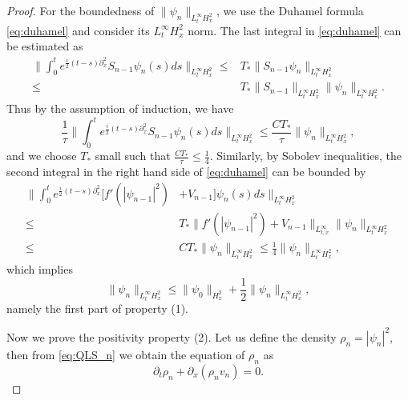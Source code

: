 \documentclass[leqno]{amsart}
\theoremstyle{plain}
\theoremstyle{definition}
\theoremstyle{remark}
\theoremstyle{plain}
\theoremstyle{plain}
\def\d{{\partial}}
\numberwithin{equation}{section}
\begin{document}
\begin{proof}
For the boundedness of $\|\psi_n\|_{L^\infty_tH^2_x}$, we use the Duhamel formula \eqref{eq:duhamel} and consider its $L^\infty_tH^2_x$ norm. The last integral in \eqref{eq:duhamel} can be estimated as
\begin{align*}
\|\int_0^te^{\frac{i}{2}(t-s)\d_x^2}S_{n-1}\psi_n(s)ds\|_{L^\infty_tH^2_x}\leq&  T_* \|S_{n-1}\psi_n \|_{L^\infty_tH^2_x}\\
\leq & T_* \|S_{n-1}\|_{L^\infty_tH^2_x}\|\psi_n \|_{L^\infty_tH^2_x}.
\end{align*}
Thus by the assumption of induction, we have
\[
\frac{1}{\tau}\|\int_0^te^{\frac{i}{2}(t-s)\d_x^2}S_{n-1}\psi_n(s)ds\|_{L^\infty_tH^2_x}\leq \frac{CT_*}{\tau} \|\psi_n \|_{L^\infty_tH^2_x},
\]
and we choose $T_*$ small such that $\frac{CT_*}{\tau}\leq \frac14$. Similarly, by Sobolev inequalities, the second integral in the right hand side of \eqref{eq:duhamel} can be bounded by
\begin{align*}
\|\int_0^te^{\frac{i}{2}(t-s)\d_x^2}[f'(|\psi_{n-1}|^2)&+V_{n-1}]\psi_n(s)ds\|_{L^\infty_tH^2_x}\\
\leq & T_*\|f'(|\psi_{n-1}|^2)+V_{n-1}\|_{L^\infty_{t,x}}\|\psi_n\|_{L_t^\infty H^2_x}\\
\leq & CT_*\|\psi_n\|_{L_t^\infty H^2_x}\leq \frac14\|\psi_n\|_{L_t^\infty H^2_x},
\end{align*}
which implies
\[
\|\psi_n\|_{L_t^\infty H^2_x}\leq \|\psi_0\|_{H^2_x}+\frac12\|\psi_n\|_{L_t^\infty H^2_x},
\]
namely the first part of property (1). 

Now we prove the positivity property (2). Let us define the density $\rho_n=|\psi_n|^2$, then from \eqref{eq:QLS_n} we obtain the equation of $\rho_n$ as
\[
\d_t\rho_n+\d_x (\rho_n v_n)=0.
\]


\end{proof}
\end{document}
